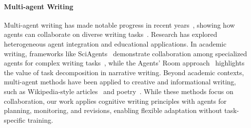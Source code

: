 \paragraph{Multi-agent Writing}
Multi-agent writing has made notable progress in recent years~\cite{hu-etal-2025-debate,pichlmair2024dramaengineframeworknarrative}, showing how agents can collaborate on diverse writing tasks~\cite{10.1007/s11704-024-40231-1,hong2024metagpt}. Research has explored heterogeneous agent integration\cite{chen2025internet} and educational applications\cite{10410857}. In academic writing, frameworks like SciAgents~\cite{Ghafarollahi2024SciAgentsAS} demonstrate collaboration among specialized agents for complex writing tasks~\cite{2024autosurvey,DArcy2024MARGMR,su2024headsbetteronemultiagent}, while the Agents’ Room approach~\cite{huot2024agentsroomnarrativegeneration} highlights the value of task decomposition in narrative writing.
Beyond academic contexts, multi-agent methods have been applied to creative and informational writing, such as Wikipedia-style articles~\cite{shao-etal-2024-assisting} and poetry~\cite{zhang2024llmbasedmultiagentpoetrygeneration,chen-etal-2024-evaluating-diversity}. 
While these methods focus on collaboration, our work applies cognitive writing principles with agents for planning, monitoring, and revisions, enabling flexible adaptation without task-specific training.